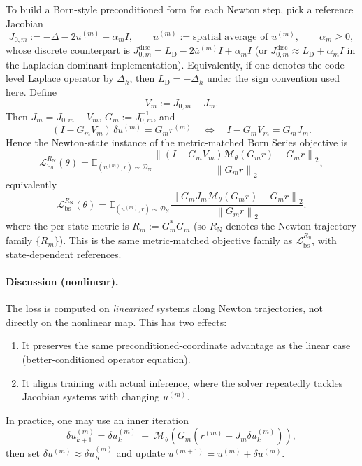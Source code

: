 \documentclass{article}
\providecommand{\E}{\mathbb{E}}
\providecommand{\I}{I}
\newcommand{\norm}[1]{\left\lVert #1 \right\rVert_2}
\theoremstyle{plain}
\theoremstyle{remark}
\begin{document}
To build a Born-style preconditioned form for each Newton step, pick a reference Jacobian
\begin{equation}
J_{0,m}:=-\Delta-2\bar{u}^{(m)}+\alpha_m \I,
\qquad
\bar{u}^{(m)}:=\text{spatial average of }u^{(m)},
\qquad
\alpha_m\ge 0,
\label{eq:newton_ref}
\end{equation}
whose discrete counterpart is $J_{0,m}^{\mathrm{disc}}=L_{\mathrm{D}}-2\bar u^{(m)}I+\alpha_m I$ (or $J_{0,m}^{\mathrm{disc}}\approx L_{\mathrm{D}}+\alpha_m I$ in the Laplacian-dominant implementation). Equivalently, if one denotes the code-level Laplace operator by $\Delta_h$, then $L_{\mathrm{D}}=-\Delta_h$ under the sign convention used here. Define
\begin{equation}
V_m:=J_{0,m}-J_m.
\label{eq:newton_vm}
\end{equation}
Then $J_m=J_{0,m}-V_m$, $G_m:=J_{0,m}^{-1}$, and
\begin{equation}
(I-G_mV_m)\,\delta u^{(m)}=G_m r^{(m)}
\quad\Leftrightarrow\quad
I-G_mV_m=G_mJ_m.
\label{eq:newton_born_identity}
\end{equation}
Hence the Newton-state instance of the metric-matched Born Series objective is
\begin{equation}
\mathcal{L}_{\mathrm{bs}}^{R_{\mathrm{N}}}(\theta)
=
\E_{(u^{(m)},r)\sim\mathcal{D}_{\mathrm{N}}}
\frac{
\norm{
(I-G_mV_m)\mathcal{M}_\theta(G_m r)-G_m r
}
}{
\norm{G_m r}
},
\label{eq:nl_bs_loss}
\end{equation}
equivalently
\begin{equation}
\mathcal{L}_{\mathrm{bs}}^{R_{\mathrm{N}}}(\theta)
=
\E_{(u^{(m)},r)\sim\mathcal{D}_{\mathrm{N}}}
\frac{
\norm{
G_mJ_m\mathcal{M}_\theta(G_m r)-G_m r
}
}{
\norm{G_m r}
}.
\label{eq:nl_bs_loss_eq}
\end{equation}
where the per-state metric is $R_m:=G_m^\ast G_m$ (so $R_{\mathrm{N}}$ denotes the Newton-trajectory family $\{R_m\}$). This is the same metric-matched objective family as $\mathcal{L}_{\mathrm{bs}}^{R_\eta}$, with state-dependent references.

\paragraph{Discussion (nonlinear).}
The loss is computed on \emph{linearized} systems along Newton trajectories, not directly on the nonlinear map. This has two effects:
\begin{enumerate}
\item It preserves the same preconditioned-coordinate advantage as the linear case (better-conditioned operator equation).
\item It aligns training with actual inference, where the solver repeatedly tackles Jacobian systems with changing $u^{(m)}$.
\end{enumerate}
In practice, one may use an inner iteration
\begin{equation}
\delta u_{k+1}^{(m)}
=
\delta u_k^{(m)}
\;+\;
\mathcal{M}_\theta\!\left(
G_m\left(r^{(m)}-J_m\delta u_k^{(m)}\right)
\right),
\label{eq:newton_inner_iter}
\end{equation}
then set $\delta u^{(m)}\approx \delta u_{K}^{(m)}$ and update $u^{(m+1)}=u^{(m)}+\delta u^{(m)}$.
\end{document}
